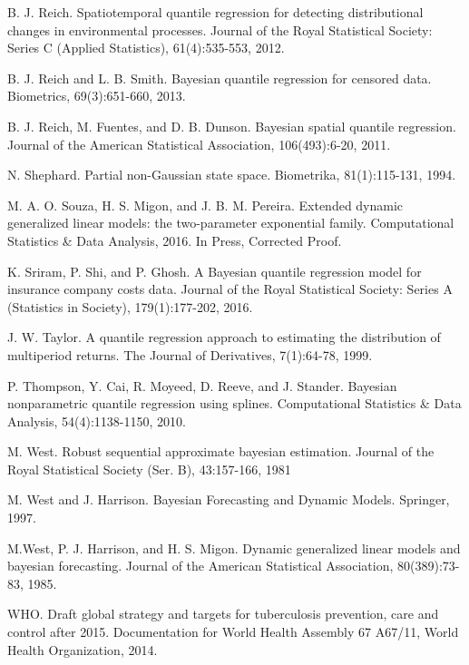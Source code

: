 \documentclass[12pt,a4paper]{article}\usepackage[]{graphicx}\usepackage[]{color}\usepackage{subfigure}
\begin{document}
\begin{thebibliography}{HHH11}
B. J. Reich. Spatiotemporal quantile regression for detecting distributional
changes in environmental processes. Journal of the Royal Statistical
Society: Series C (Applied Statistics), 61(4):535-553, 2012.

B. J. Reich and L. B. Smith. Bayesian quantile regression for censored data.
Biometrics, 69(3):651-660, 2013.

B. J. Reich, M. Fuentes, and D. B. Dunson. Bayesian spatial quantile
regression. Journal of the American Statistical Association, 106(493):6-20, 2011.

N. Shephard. Partial non-Gaussian state space. Biometrika, 81(1):115-131,
1994.

M. A. O. Souza, H. S. Migon, and J. B. M. Pereira. Extended dynamic generalized linear models: the two-parameter exponential family.
Computational Statistics \& Data Analysis, 2016. In Press, Corrected Proof.

K. Sriram, P. Shi, and P. Ghosh. A Bayesian quantile regression model for
insurance company costs data. Journal of the Royal Statistical Society:
Series A (Statistics in Society), 179(1):177-202, 2016.

J. W. Taylor. A quantile regression approach to estimating the distribution
of multiperiod returns. The Journal of Derivatives, 7(1):64-78, 1999.

P. Thompson, Y. Cai, R. Moyeed, D. Reeve, and J. Stander. Bayesian
nonparametric quantile regression using splines. Computational Statistics
\& Data Analysis, 54(4):1138-1150, 2010.

M. West. Robust sequential approximate bayesian estimation. Journal of
the Royal Statistical Society (Ser. B), 43:157-166, 1981

M. West and J. Harrison. Bayesian Forecasting and Dynamic Models. Springer, 1997.

M.West, P. J. Harrison, and H. S. Migon. Dynamic generalized linear models
and bayesian forecasting. Journal of the American Statistical Association,
80(389):73-83, 1985.

WHO. Draft global strategy and targets for tuberculosis prevention, care and
control after 2015. Documentation for World Health Assembly 67 A67/11,
World Health Organization, 2014.


\end{thebibliography}
\end{document}
